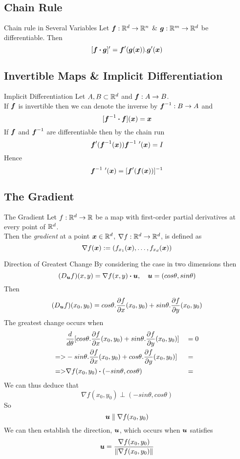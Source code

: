 \documentclass[11pt,a4paper]{article}
\begin{document}
\subsection{Chain Rule}

\subtitle{Theorem 11.01 - }{Chain rule in Several Variables}
Let $\boldsymbol{f} : \mathbb{R}^d \to \mathbb{R}^n$ \& $\boldsymbol{g} : \mathbb{R}^m \to \mathbb{R}^d$ be differentiable. Then
$$[\boldsymbol{f} \boldsymbol{\cdot} \boldsymbol{g}]' = \boldsymbol{f}'(\boldsymbol{g}(\boldsymbol{x})).\boldsymbol{g}'(\boldsymbol{x})$$

\subsection{Invertible Maps \& Implicit Differentiation}

\subtitle{Definition 11.02 - }{Implicit Differentiation}
Let $A, B \subset \mathbb{R}^d$ and $\boldsymbol{f} : A \to B$.\\
If $\boldsymbol{f}$ is invertible then we can denote the inverse by $\boldsymbol{f}^{-1} : B \to A$ and $$[\boldsymbol{f}^{-1} \boldsymbol{\cdot} \boldsymbol{f}](\boldsymbol{x}) = \boldsymbol{x}$$
If $\boldsymbol{f}$ and $\boldsymbol{f}^{-1}$ are differentiable then by the chain run $$\boldsymbol{f}' (\boldsymbol{f}^{-1} (\boldsymbol{x})) \boldsymbol{f}^{-1}\ '(\boldsymbol{x}) = I$$
Hence $$\boldsymbol{f}^{-1}\ '(\boldsymbol{x}) = [\boldsymbol{f}'(\boldsymbol{f}(\boldsymbol{x}))]^{-1}$$

\subsection{The Gradient}

\subtitle{Defintion 11.03 - }{The Gradient}
Let $f : \mathbb{R}^d \to \mathbb{R}$ be a map with first-order partial derivatives at every point of $\mathbb{R}^d$.\\
Then the \textit{gradient} at a point $\boldsymbol{x} \in \mathbb{R}^d$, $\nabla f : \mathbb{R}^d \to \mathbb{R}^d$, is defined as $$\nabla f(\boldsymbol{x}) := (f_{x_1}(\boldsymbol{x}), \dots, f_{x_d}(\boldsymbol{x}))$$

\subtitle{Definition 11.04 - }{Direction of Greatest Change}
By considering the case in two dimensions then
$$(D_{\boldsymbol{u}}f)(x,y) = \nabla f(x,y) \boldsymbol{\cdot} \boldsymbol{u},\quad \boldsymbol{u} = (cos\theta, sin\theta)$$
Then
$$(D_{\boldsymbol{u}}f)(x_0,y_0) = cos\theta.\frac{\partial f}{\partial x}(x_0, y_0) + sin\theta.\frac{\partial f}{\partial y}(x_0, y_0)$$
The greatest change occurs when
\begin{alignat*}{2}
  &\frac{d}{d\theta} [cos\theta.\frac{\partial f}{\partial x}(x_0, y_0) + sin\theta.\frac{\partial f}{\partial y}(x_0, y_0)] &&= 0 \\
  =>&-sin\theta.\frac{\partial f}{\partial x}(x_0, y_0) + cos\theta.\frac{\partial f}{\partial y}(x_0, y_0)] &&= \\
  =>&\nabla f(x_0, y_0) \boldsymbol{\cdot} (-sin\theta, cos\theta) &&= \\
\end{alignat*}
We can thus deduce that $$\nabla f(x_0, y_0) \perp (-sin\theta, cos\theta)$$
So
$$\boldsymbol{u} \parallel \nabla f(x_0, y_0)$$
We can then establish the direction, $\boldsymbol{u}$, which occurs when $\boldsymbol{u}$ satisfies $$\boldsymbol{u} = \frac{\nabla f(x_0, y_0)}{\|\nabla f(x_0, y_0)\|}$$
\end{document}

